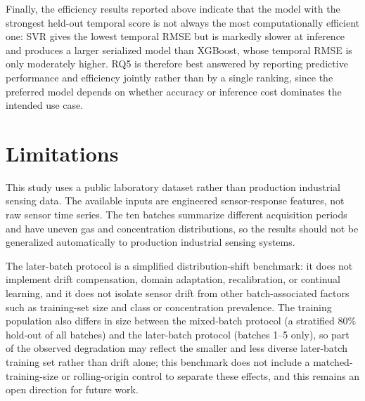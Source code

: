 \documentclass[conference]{IEEEtran}
\begin{document}
Finally, the efficiency results reported above indicate that the model with the strongest held-out temporal score is not always the most computationally efficient one: SVR gives the lowest temporal RMSE but is markedly slower at inference and produces a larger serialized model than XGBoost, whose temporal RMSE is only moderately higher. RQ5 is therefore best answered by reporting predictive performance and efficiency jointly rather than by a single ranking, since the preferred model depends on whether accuracy or inference cost dominates the intended use case.

\section{Limitations}
\label{sec:limitations}
This study uses a public laboratory dataset rather than production industrial sensing data. The available inputs are engineered sensor-response features, not raw sensor time series. The ten batches summarize different acquisition periods and have uneven gas and concentration distributions, so the results should not be generalized automatically to production industrial sensing systems.

The later-batch protocol is a simplified distribution-shift benchmark: it does not implement drift compensation, domain adaptation, recalibration, or continual learning, and it does not isolate sensor drift from other batch-associated factors such as training-set size and class or concentration prevalence. The training population also differs in size between the mixed-batch protocol (a stratified 80\% hold-out of all batches) and the later-batch protocol (batches 1--5 only), so part of the observed degradation may reflect the smaller and less diverse later-batch training set rather than drift alone; this benchmark does not include a matched-training-size or rolling-origin control to separate these effects, and this remains an open direction for future work.
\end{document}
